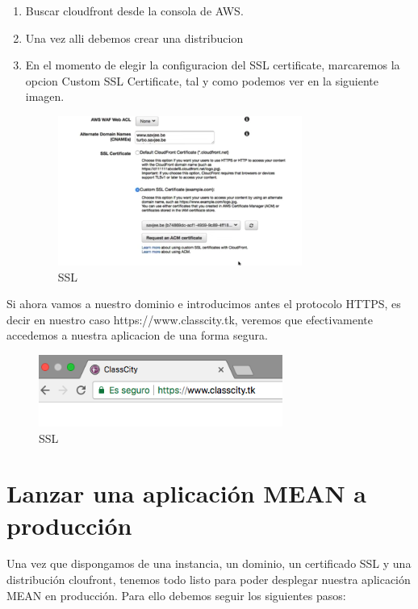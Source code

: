 \begin{itemize}
    \begin{enumerate}
    \item Buscar cloudfront desde la consola de AWS. 
    \item Una vez alli debemos crear una distribucion
    \item En el momento de elegir la configuracion del SSL certificate, marcaremos la opcion Custom SSL Certificate, tal y como podemos ver en la siguiente imagen.
    \begin{figure}[H]
    \centering
    \includegraphics[width=80mm]{memoria/LaTeX/img/despliegue/customssl.png}
    \caption{SSL}
    \end{figure}
    \end{enumerate}
    
    Si ahora vamos a nuestro dominio e introducimos antes el protocolo HTTPS, es decir en nuestro caso https://www.classcity.tk, veremos que efectivamente accedemos a nuestra aplicacion de una forma segura.  

    \begin{figure}[H]
    \centering
    \includegraphics[width=80mm]{memoria/LaTeX/img/despliegue/https.png}
    \caption{SSL}
    \end{figure}

\end{itemize}
    
\section{Lanzar una aplicación MEAN a producción} Una vez que dispongamos de una instancia, un dominio, un certificado SSL y una distribución cloufront, tenemos todo listo para poder desplegar nuestra aplicación MEAN en producción. Para ello debemos seguir los siguientes pasos:

